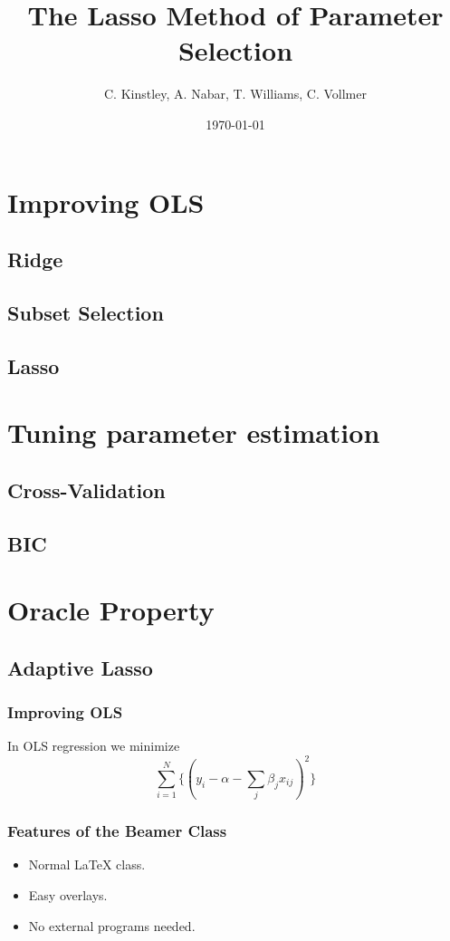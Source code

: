 \documentclass{beamer}
\title{The Lasso Method of Parameter Selection}
\author{C. Kinstley, A. Nabar, T. Williams, C. Vollmer }
\date{\today}
\begin{document}
\frame{\titlepage}

\section[Outline]{}
\frame{\tableofcontents}

\section{Improving OLS}
\subsection{Ridge}
\subsection{Subset Selection}
\subsection{Lasso}

\section{Tuning parameter estimation}
\subsection{Cross-Validation}
\subsection{BIC}

\section{Oracle Property}
\subsection{Adaptive Lasso}

\frame
{
\frametitle{Improving OLS}
	In OLS regression we minimize
	\begin{equation*}
\sum_{i=1}^N\{(y_i - \alpha-\sum_j\beta_jx_{ij} )^2 \}
	\end{equation*}

}


\frame
{
  \frametitle{Features of the Beamer Class}

  \begin{itemize}
  \item<1-> Normal LaTeX class.
  \item<2-> Easy overlays.
  \item<3-> No external programs needed.      
  \end{itemize}
}
\end{document}
